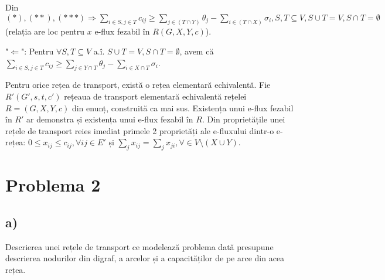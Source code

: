 \documentclass[a4paper,12pt]{article}
\begin{document}
Din $(*), (**), (***) \Rightarrow \sum\limits_{i \in S, j \in T} c_{ij} \geq \sum\limits_{j \in (T \cap Y)} \theta_j - \sum\limits_{i \in (T \cap X)} \sigma_i, S,T \subseteq V, S\cup T = V, S \cap T = \emptyset$ (relația are loc pentru $x$ e-flux fezabil în $R(G,X,Y,c)$).
\newline

"$\Leftarrow$": Pentru $\forall S,T \subseteq V$ a.î. $S \cup T = V, S \cap T = \emptyset$, avem că $\sum\limits_{i \in S, j \in T} c_{ij} \geq \sum\limits_{j \in Y \cap T} \theta_j - \sum\limits_{i \in X \cap T} \sigma_i$. 

Pentru orice rețea de transport, există o rețea elementară echivalentă. Fie $R'(G', s, t, c')$ rețeaua de transport elementară echivalentă rețelei $R=(G,X,Y,c)$ din enunț, construită ca mai sus. Existența unui e-flux fezabil în $R'$ ar demonstra și existența unui e-flux fezabil în $R$. Din proprietățile unei rețele de transport reies imediat primele 2 proprietăți ale e-fluxului dintr-o e-rețea: $0 \leq x_{ij} \leq c_{ij}, \forall ij \in E'$ și $\sum\limits_{j}x_{ij} = \sum\limits_{j}x_{ji}, \forall \in V \setminus (X \cup Y)$.


\section{Problema 2}

\subsection{a)}

Descrierea unei rețele de transport ce modelează problema dată presupune descrierea nodurilor din digraf, a arcelor și a capacităților de pe arce din acea rețea.
\end{document}
